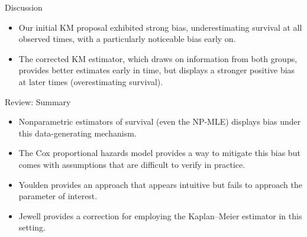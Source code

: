 \documentclass[12pt,t]{beamer}
\begin{document}

\begin{frame}[c]{Discussion}

\begin{center}
\begin{itemize}
  \itemsep12pt
  \item Our initial KM proposal exhibited strong bias, underestimating survival
    at all observed times, with a particularly noticeable bias early on.
  \item The corrected KM estimator, which draws on information from both groups,
    provides better estimates early in time, but displays a stronger positive
    bias at later times (overestimating survival).
\end{itemize}
\end{center}

\note{
}

\end{frame}


\begin{frame}[c]{Review: Summary}

\begin{center}
\begin{itemize}
  \itemsep12pt
  \item Nonparametric estimators of survival (even the NP-MLE) displays bias
    under this data-generating mechanism.
  \item The Cox proportional hazards model provides a way to mitigate this bias
    but comes with assumptions that are difficult to verify in practice.
  \item Youlden provides an approach that appears intuitive but fails to
    approach the parameter of interest.
  \item Jewell provides a correction for employing the Kaplan--Meier estimator
    in this setting.
\end{itemize}
\end{center}


\end{frame}


\setbeamercovered{}
\beamerdefaultoverlayspecification{}
\end{document}
